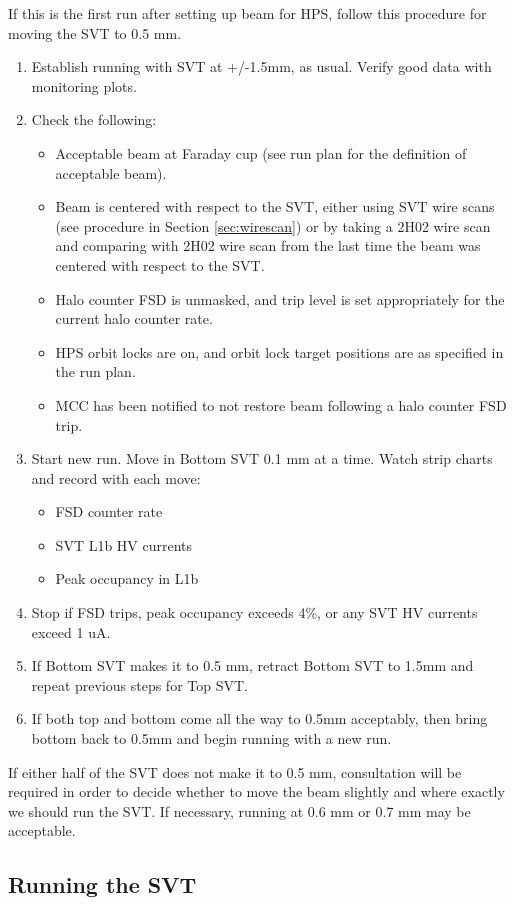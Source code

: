\documentclass[12pt]{report}
\begin{document}
If this is the first run after setting up beam for HPS, follow this procedure for moving the SVT to 0.5 mm.
\begin{enumerate}
\item Establish running with SVT at +/-1.5mm, as usual.  Verify good data with monitoring plots.
\item Check the following:
\begin{itemize}
\item Acceptable beam at Faraday cup (see run plan for the definition of acceptable beam).
\item Beam is centered with respect to the SVT, either using SVT wire scans (see procedure in Section \ref{sec:wirescan}) or by taking a 2H02 wire scan and comparing with 2H02 wire scan from the last time the beam was centered with respect to the SVT.
\item Halo counter FSD is unmasked, and trip level is set appropriately for the current halo counter rate.
\item HPS orbit locks are on, and orbit lock target positions are as specified in the run plan.
\item MCC has been notified to not restore beam following a halo counter FSD trip.
\end{itemize}
\item Start new run.  Move in Bottom SVT 0.1 mm at a time.  Watch strip charts and record with each move:
\begin{itemize}
\item FSD counter rate
\item SVT L1b HV currents
\item Peak occupancy in L1b
\end{itemize}
\item Stop if FSD trips, peak occupancy exceeds 4\%, or any SVT HV currents exceed 1 uA.
\item If Bottom SVT makes it to 0.5 mm, retract Bottom SVT to 1.5mm and repeat previous steps for Top SVT.
\item If both top and bottom come all the way to 0.5mm acceptably, then bring bottom back to 0.5mm and begin running with a new run.
\end{enumerate}

If either half of the SVT does not make it to 0.5 mm, consultation will be required in order to decide whether to move the beam slightly and where exactly we should run the SVT.  If necessary, running at 0.6 mm or 0.7 mm may be acceptable.

\subsection{Running the SVT}
\end{document}
